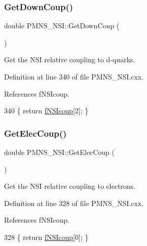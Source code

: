 \subsubsection{\texorpdfstring{Get\+Down\+Coup()}{GetDownCoup()}}
{\footnotesize\ttfamily double P\+M\+N\+S\+\_\+\+N\+S\+I\+::\+Get\+Down\+Coup (\begin{DoxyParamCaption}{ }\end{DoxyParamCaption})\hspace{0.3cm}{\ttfamily [virtual]}}

Get the N\+SI relative coupling to d-\/quarks. 

Definition at line 340 of file P\+M\+N\+S\+\_\+\+N\+S\+I.\+cxx.



References f\+N\+S\+Icoup.


\begin{DoxyCode}
340 \{ \textcolor{keywordflow}{return} \hyperlink{classOscProb_1_1PMNS__NSI_a1ac51957bbc4cec9fcfd8f816491cc95}{fNSIcoup}[2]; \}
\end{DoxyCode}
\mbox{\label{classOscProb_1_1PMNS__NSI_adbee38997ab80f8d1a9750d3eae0afea}} 
\subsubsection{\texorpdfstring{Get\+Elec\+Coup()}{GetElecCoup()}}
{\footnotesize\ttfamily double P\+M\+N\+S\+\_\+\+N\+S\+I\+::\+Get\+Elec\+Coup (\begin{DoxyParamCaption}{ }\end{DoxyParamCaption})\hspace{0.3cm}{\ttfamily [virtual]}}

Get the N\+SI relative coupling to electrons. 

Definition at line 328 of file P\+M\+N\+S\+\_\+\+N\+S\+I.\+cxx.



References f\+N\+S\+Icoup.


\begin{DoxyCode}
328 \{ \textcolor{keywordflow}{return} \hyperlink{classOscProb_1_1PMNS__NSI_a1ac51957bbc4cec9fcfd8f816491cc95}{fNSIcoup}[0]; \}
\end{DoxyCode}
\mbox{\label{classOscProb_1_1PMNS__Base_acc0d46cc4b8f911b40b807225003bbed}} 
